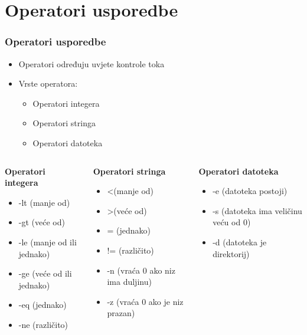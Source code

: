 \documentclass{beamer}
\begin{document}
\section{Operatori usporedbe}
\begin{frame}
\frametitle{Operatori usporedbe}
\begin{itemize}
	\item Operatori određuju uvjete kontrole toka
	\item Vrste operatora:
	\begin{itemize}
		\item Operatori integera
		\item Operatori stringa
		\item Operatori datoteka		
	\end{itemize}
\end{itemize}
\end{frame}

\begin{frame}
	\begin{columns}[onlytextwidth]
		\begin{column}{0.33\textwidth}
			\centering
			\textbf{Operatori integera} \\
			\begin{itemize}
				\item -lt (manje od)
				\item -gt (veće od)
				\item -le (manje od ili jednako)
				\item -ge (veće od ili jednako)
				\item -eq (jednako)
				\item -ne (različito)
			\end{itemize}
		\end{column}
		\begin{column}{0.33\textwidth}
			\centering
			\textbf{Operatori stringa} \\
			\begin{itemize}
				\item \textless (manje od)
				\item \textgreater (veće od)
				\item = (jednako)
				\item != (različito)
				\item -n (vraća 0 ako niz ima duljinu)
				\item -z (vraća 0 ako je niz prazan)
			\end{itemize}
		\end{column}
		\begin{column}{0.33\textwidth}
			\centering
			\textbf{Operatori datoteka} \\
			\begin{itemize}
				\item -e (datoteka postoji)
				\item -s (datoteka ima veličinu veću od 0)
				\item -d (datoteka je direktorij)
			\end{itemize}
		\end{column}
	\end{columns}
\end{frame}
\end{document}
